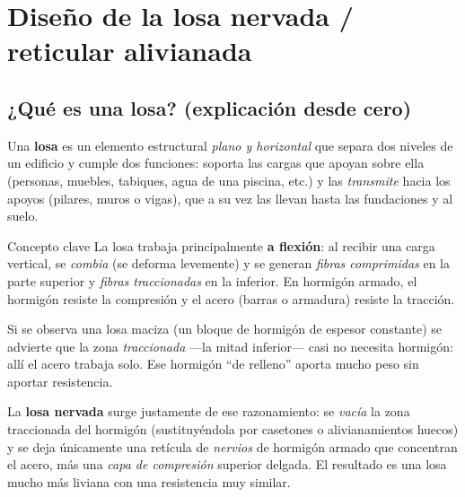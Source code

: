 ﻿%
\chapter{Diseño de la losa nervada / reticular alivianada}
\label{cap:losa}

\section{¿Qué es una losa? (explicación desde cero)}
\label{sec:que_es_losa}

Una \textbf{losa} es un elemento estructural \emph{plano y horizontal}
que separa dos niveles de un edificio y cumple dos funciones: soporta
las cargas que apoyan sobre ella (personas, muebles, tabiques, agua de
una piscina, etc.) y las \emph{transmite} hacia los apoyos (pilares,
muros o vigas), que a su vez las llevan hasta las fundaciones y al
suelo.

\begin{clave}{Concepto clave}
La losa trabaja principalmente \textbf{a flexión}: al recibir una carga
vertical, se \emph{combia} (se deforma levemente) y se generan
\emph{fibras comprimidas} en la parte superior y \emph{fibras
traccionadas} en la inferior. En hormigón armado, el hormigón resiste la
compresión y el acero (barras o armadura) resiste la tracción.
\end{clave}

Si se observa una losa maciza (un bloque de hormigón de espesor
constante) se advierte que la zona \emph{traccionada} ---la mitad
inferior--- casi no necesita hormigón: allí el acero trabaja solo. Ese
hormigón ``de relleno'' aporta mucho peso sin aportar resistencia.

La \textbf{losa nervada} surge justamente de ese razonamiento: se
\emph{vacía} la zona traccionada del hormigón (sustituyéndola por
casetones o alivianamientos huecos) y se deja únicamente una retícula
de \emph{nervios} de hormigón armado que concentran el acero, más una
\emph{capa de compresión} superior delgada. El resultado es una losa
mucho más liviana con una resistencia muy similar.

